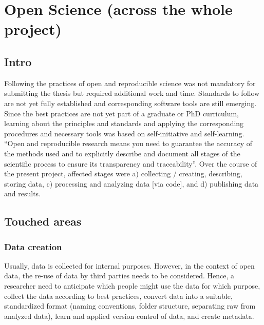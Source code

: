 



\section{Open Science (across the whole project)}





\subsection{Intro}
%
Following the practices of open and reproducible science was not mandatory for
submitting the thesis but required additional work and time.
%
Standards to follow are not yet fully established and corresponding software
tools are still emerging.
%
Since the best practices are not yet part of a graduate or PhD curriculum,
learning about the principles and standards and applying the corresponding
procedures and necessary tools was based on self-initiative and self-learning.
%
``Open and reproducible research means you need to guarantee the accuracy of the
methods used and to explicitly describe and document all stages of the
scientific process to ensure its transparency and traceability''.
%
Over the course of the present project, affected stages were
a) collecting / creating, describing, storing data,
c) processing and analyzing data [via code], and
d) publishing data and results.



\subsection{Touched areas}



\subsubsection{Data creation}
Usually, data is collected for internal purposes.
%
However, in the context of open data, the re-use of data by third parties needs
to be considered.
%
Hence, a researcher need to anticipate which people might use the data for which
purpose,
%
collect the data according to best practices,
%
convert data into a suitable, standardized format (naming conventions, folder
structure, separating raw from analyzed data),
%
learn and applied version control of data, and
%
create metadata.


